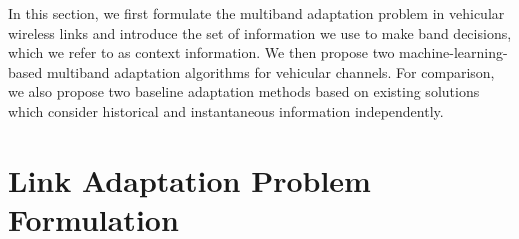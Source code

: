 

In this section, we first formulate the multiband 
adaptation problem in vehicular wireless links and introduce the set of information we use to make band decisions, which we refer to as context information. We then propose two machine-learning-based 
multiband adaptation algorithms for vehicular channels. For comparison, we also propose two baseline adaptation methods based on existing solutions which consider historical and instantaneous information independently.




\section{Link Adaptation Problem Formulation}

